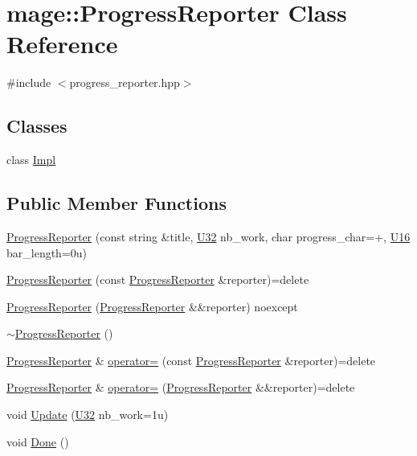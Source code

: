 \hypertarget{classmage_1_1_progress_reporter}{}\section{mage\+:\+:Progress\+Reporter Class Reference}
\label{classmage_1_1_progress_reporter}


{\ttfamily \#include $<$progress\+\_\+reporter.\+hpp$>$}

\subsection*{Classes}
\begin{DoxyCompactItemize}
\item 
class \mbox{\hyperlink{classmage_1_1_progress_reporter_1_1_impl}{Impl}}
\end{DoxyCompactItemize}
\subsection*{Public Member Functions}
\begin{DoxyCompactItemize}
\item 
\mbox{\hyperlink{classmage_1_1_progress_reporter_a900eb503981e2d83b721ce0612950285}{Progress\+Reporter}} (const string \&title, \mbox{\hyperlink{namespacemage_a41c104c036fba3756a74e19f793eeaa1}{U32}} nb\+\_\+work, char progress\+\_\+char=\textquotesingle{}+\textquotesingle{}, \mbox{\hyperlink{namespacemage_af69057eec1ce005c1c3b34ae33486f16}{U16}} bar\+\_\+length=0u)
\item 
\mbox{\hyperlink{classmage_1_1_progress_reporter_a681d23ec19019c04a8a977c4f6f280ea}{Progress\+Reporter}} (const \mbox{\hyperlink{classmage_1_1_progress_reporter}{Progress\+Reporter}} \&reporter)=delete
\item 
\mbox{\hyperlink{classmage_1_1_progress_reporter_a811686b20299f63476c5a5b17c6fa443}{Progress\+Reporter}} (\mbox{\hyperlink{classmage_1_1_progress_reporter}{Progress\+Reporter}} \&\&reporter) noexcept
\item 
\mbox{\hyperlink{classmage_1_1_progress_reporter_aa543239c6dd4474a77cf4cf6904c1b26}{$\sim$\+Progress\+Reporter}} ()
\item 
\mbox{\hyperlink{classmage_1_1_progress_reporter}{Progress\+Reporter}} \& \mbox{\hyperlink{classmage_1_1_progress_reporter_aa98411a059ad0e77ca53d064176f3a86}{operator=}} (const \mbox{\hyperlink{classmage_1_1_progress_reporter}{Progress\+Reporter}} \&reporter)=delete
\item 
\mbox{\hyperlink{classmage_1_1_progress_reporter}{Progress\+Reporter}} \& \mbox{\hyperlink{classmage_1_1_progress_reporter_adfc77427eaff8caf71c1995bf986edc5}{operator=}} (\mbox{\hyperlink{classmage_1_1_progress_reporter}{Progress\+Reporter}} \&\&reporter)=delete
\item 
void \mbox{\hyperlink{classmage_1_1_progress_reporter_aee55b3ced46f7512634b0443ff9807f5}{Update}} (\mbox{\hyperlink{namespacemage_a41c104c036fba3756a74e19f793eeaa1}{U32}} nb\+\_\+work=1u)
\item 
void \mbox{\hyperlink{classmage_1_1_progress_reporter_a11d758647ac2082bc296ab53a7454eaa}{Done}} ()
\end{DoxyCompactItemize}
